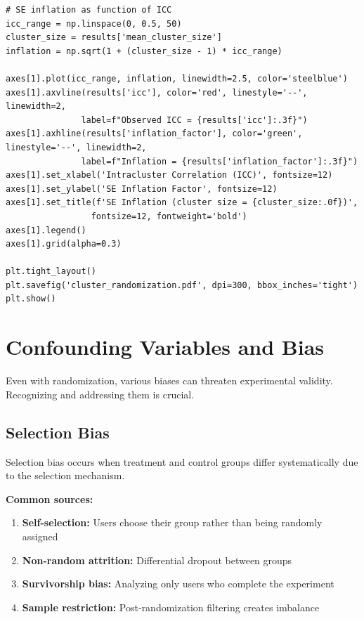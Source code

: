 \begin{lstlisting}
# SE inflation as function of ICC
icc_range = np.linspace(0, 0.5, 50)
cluster_size = results['mean_cluster_size']
inflation = np.sqrt(1 + (cluster_size - 1) * icc_range)

axes[1].plot(icc_range, inflation, linewidth=2.5, color='steelblue')
axes[1].axvline(results['icc'], color='red', linestyle='--', linewidth=2,
               label=f"Observed ICC = {results['icc']:.3f}")
axes[1].axhline(results['inflation_factor'], color='green', linestyle='--', linewidth=2,
               label=f"Inflation = {results['inflation_factor']:.3f}")
axes[1].set_xlabel('Intracluster Correlation (ICC)', fontsize=12)
axes[1].set_ylabel('SE Inflation Factor', fontsize=12)
axes[1].set_title(f'SE Inflation (cluster size = {cluster_size:.0f})',
                 fontsize=12, fontweight='bold')
axes[1].legend()
axes[1].grid(alpha=0.3)

plt.tight_layout()
plt.savefig('cluster_randomization.pdf', dpi=300, bbox_inches='tight')
plt.show()
\end{lstlisting}

\section{Confounding Variables and Bias}

Even with randomization, various biases can threaten experimental validity. Recognizing and addressing them is crucial.

\subsection{Selection Bias}

Selection bias occurs when treatment and control groups differ systematically due to the selection mechanism.

\textbf{Common sources:}

\begin{enumerate}
    \item \textbf{Self-selection:} Users choose their group rather than being randomly assigned

    \item \textbf{Non-random attrition:} Differential dropout between groups

    \item \textbf{Survivorship bias:} Analyzing only users who complete the experiment

    \item \textbf{Sample restriction:} Post-randomization filtering creates imbalance
\end{enumerate}

